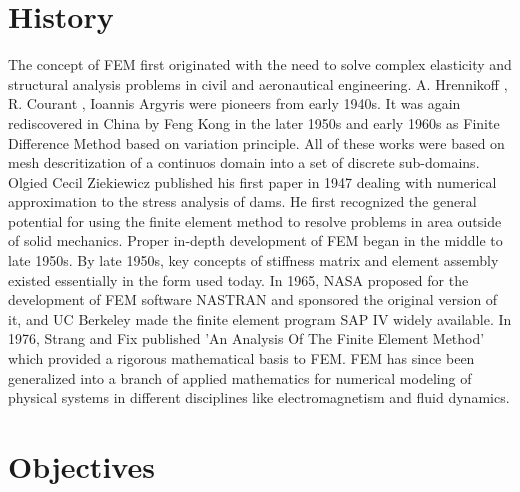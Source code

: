 \section{\bf{History}}
The concept of FEM first originated with the need to solve complex elasticity and structural analysis problems in civil and aeronautical engineering.  A. Hrennikoff \cite{hrennikoff1941solution}, R. Courant \cite{courant1943variational}, Ioannis Argyris \cite{bandela2020finite} were pioneers from early 1940s. It was again rediscovered in China by Feng Kong  in the later 1950s and early 1960s as Finite Difference Method based on variation principle. All of these works were based on mesh descritization of a continuos domain into a set of discrete sub-domains.
	Olgied Cecil Ziekiewicz\cite{stein2009olgierd} published his first paper in 1947 dealing with numerical approximation to the stress analysis of dams. He first recognized the general potential for using the finite element method to resolve problems in area outside of solid mechanics. 
	Proper in-depth development of FEM began in the middle to late 1950s. By late 1950s, key concepts of stiffness matrix and element assembly existed essentially in the form used today. In 1965, NASA proposed for the development of FEM software NASTRAN and sponsored the original version of it, and UC Berkeley made the finite element program SAP IV widely available. 
	In 1976, Strang and Fix\cite{strang1973analysis} published 'An Analysis Of The Finite Element Method' which provided a rigorous mathematical basis to FEM. FEM has since been generalized into a branch of applied mathematics for numerical modeling of physical systems in different disciplines like electromagnetism and fluid dynamics\cite{zienkiewicz2005finite}\cite{banakh2022oscillations}.




\section{{\bf{Objectives}}}

